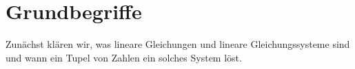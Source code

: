\section{Grundbegriffe}
\label{sec:linear_systems_fundamentals}

Zunächst klären wir, was lineare Gleichungen und lineare Gleichungssysteme
sind und wann ein Tupel von Zahlen ein solches System löst.


